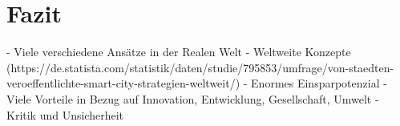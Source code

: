 \section{Fazit}

-	Viele verschiedene Ansätze in der Realen Welt 
-	Weltweite Konzepte (https://de.statista.com/statistik/daten/studie/795853/umfrage/von-staedten-veroeffentlichte-smart-city-strategien-weltweit/)
-	Enormes Einsparpotenzial
-	Viele Vorteile in Bezug auf Innovation, Entwicklung, Gesellschaft, Umwelt
-	Kritik und Unsicherheit 



